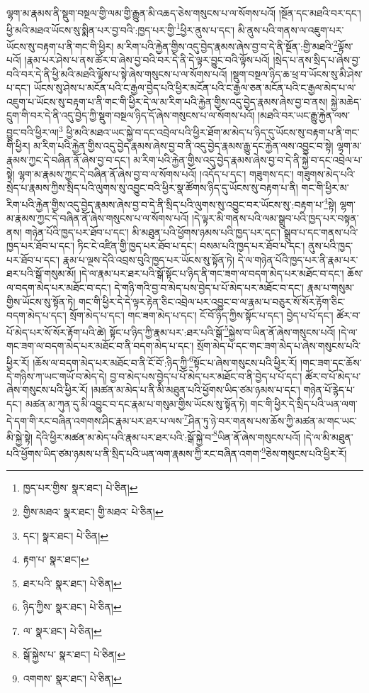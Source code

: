 ལྷག་མ་རྣམས་ནི་སྡུག་བསྔལ་གྱི་ལམ་གྱི་རྒྱུན་མི་འཆད་ཅེས་གསུངས་པ་ལ་སོགས་པའོ། །སྔོན་དང་མཐའི་བར་དང་། ཕྱི་མའི་མཐའ་ཡོངས་སུ་སྨིན་པར་བྱ་བའི་:ཁྱད་པར་གྱི་\footnote{ཁྱད་པར་གྱིས་  སྣར་ཐང་།  པེ་ཅིན། }ཕྱིར་ནུས་པ་དང་། མི་ནུས་པའི་གནས་ལ་འཇུག་པར་ཡོངས་སུ་བརྟག་པ་ནི་གང་གི་ཕྱིར། མ་རིག་པའི་རྐྱེན་གྱིས་འདུ་བྱེད་རྣམས་ཞེས་བྱ་བ་དེ་ནི་སྔོན་:གྱི་མཐའི་\footnote{གྱིས་མཐའ་  སྣར་ཐང་། གྱི་མཐའ་  པེ་ཅིན། }ལྟོས་པའོ། །རྣམ་པར་ཤེས་པ་ནས་ཚོར་བ་ཞེས་བྱ་བའི་བར་དེ་ནི་དེ་ལྟར་བྱུང་བའི་ལྟོས་པའོ། །སྲེད་པ་ནས་སྲིད་པ་ཞེས་བྱ་བའི་བར་དེ་ནི་ཕྱི་མའི་མཐའི་ལྟོས་པ་སྟེ་ཞེས་གསུངས་པ་ལ་སོགས་པའོ། །སྡུག་བསྔལ་ཉིད་ཆ་ཕྲ་བ་ཡོངས་སུ་མི་ཤེས་པ་དང་། ཡོངས་སུ་ཤེས་པ་མངོན་པའི་ང་རྒྱལ་བྱེད་པའི་ཕྱིར་མངོན་པའི་ང་རྒྱལ་ཅན་མངོན་པའི་ང་རྒྱལ་མེད་པ་ལ་འཇུག་པ་ཡོངས་སུ་བརྟག་པ་ནི་གང་གི་ཕྱིར་དེ་ལ་མ་རིག་པའི་རྐྱེན་གྱིས་འདུ་བྱེད་རྣམས་ཞེས་བྱ་བ་ནས། སྐྱེ་མཆེད་དྲུག་གི་བར་དེ་ནི་འདུ་བྱེད་ཀྱི་སྡུག་བསྔལ་ཉིད་དོ་ཞེས་གསུངས་པ་ལ་སོགས་པའོ། །མཐའི་བར་ཡང་རྒྱུ་རྐྱེན་ལས་བྱུང་བའི་ཕྱིར་ལ།\footnote{དང་།  སྣར་ཐང་།  པེ་ཅིན། } ཕྱི་མའི་མཐའ་ཡང་སྐྱེ་བ་དང་འབྲེལ་པའི་ཕྱིར་ཐོག་མ་མེད་པ་ཉིད་དུ་ཡོངས་སུ་བརྟག་པ་ནི་གང་གི་ཕྱིར། མ་རིག་པའི་རྐྱེན་གྱིས་འདུ་བྱེད་རྣམས་ཞེས་བྱ་བ་ནི་འདུ་བྱེད་རྣམས་རྒྱུ་དང་རྐྱེན་ལས་འབྱུང་བ་སྟེ། ལྷག་མ་རྣམས་ཀྱང་དེ་བཞིན་ནོ་ཞེས་བྱ་བ་དང་། མ་རིག་པའི་རྐྱེན་གྱིས་འདུ་བྱེད་རྣམས་ཞེས་བྱ་བ་དེ་ནི་སྐྱེ་བ་དང་འབྲེལ་པ་སྟེ། ལྷག་མ་རྣམས་ཀྱང་དེ་བཞིན་ནོ་ཞེས་བྱ་བ་ལ་སོགས་པའོ། །འདོད་པ་དང་། གཟུགས་དང་། གཟུགས་མེད་པའི་སྲེད་པ་རྣམས་ཀྱིས་སྲིད་པའི་ལུགས་སུ་འབྱུང་བའི་ཕྱིར་སྣ་ཚོགས་ཉིད་དུ་ཡོངས་སུ་བརྟག་པ་ནི། གང་གི་ཕྱིར་མ་རིག་པའི་རྐྱེན་གྱིས་འདུ་བྱེད་རྣམས་ཞེས་བྱ་བ་དེ་ནི་སྲིད་པའི་ལུགས་སུ་འབྱུང་བར་ཡོངས་སུ་:བརྟག་པ་\footnote{རྟག་པ་  སྣར་ཐང་། }སྟེ། ལྷག་མ་རྣམས་ཀྱང་དེ་བཞིན་ནོ་ཞེས་གསུངས་པ་ལ་སོགས་པའོ། །དེ་ལྟར་མི་གནས་པའི་ལམ་སྒྲུབ་པའི་ཁྱད་པར་བསྟན་ནས། གཉེན་པོའི་ཁྱད་པར་ཐོབ་པ་དང་། མི་མཐུན་པའི་ཕྱོགས་ཉམས་པའི་ཁྱད་པར་དང་། སྒྲུབ་པ་དང་གནས་པའི་ཁྱད་པར་ཐོབ་པ་དང་། ཏིང་ངེ་འཛིན་གྱི་ཁྱད་པར་ཐོབ་པ་དང་། བསམ་པའི་ཁྱད་པར་ཐོབ་པ་དང་། ནུས་པའི་ཁྱད་པར་ཐོབ་པ་དང་། རྣམ་པ་ལྔས་དེའི་འབྲས་བུའི་ཁྱད་པར་ཡོངས་སུ་སྟོན་ཏེ། དེ་ལ་གཉེན་པོའི་ཁྱད་པར་ནི་རྣམ་པར་ཐར་པའི་སྒོ་གསུམ་མོ། །དེ་ལ་རྣམ་པར་ཐར་པའི་སྒོ་སྟོང་པ་ཉིད་ནི་གང་ཟག་ལ་བདག་མེད་པར་མཐོང་བ་དང་། ཆོས་ལ་བདག་མེད་པར་མཐོང་བ་དང་། དེ་གཉི་གའི་བྱ་བ་མེད་པས་བྱེད་པ་པོ་མེད་པར་མཐོང་བ་དང་། རྣམ་པ་གསུམ་གྱིས་ཡོངས་སུ་སྟོན་ཏེ། གང་གི་ཕྱིར་དེ་དེ་ལྟར་རྟེན་ཅིང་འབྲེལ་པར་འབྱུང་བ་ལ་རྣམ་པ་བཅུར་སོ་སོར་རྟོག་ཅིང་བདག་མེད་པ་དང་། སྲོག་མེད་པ་དང་། གང་ཟག་མེད་པ་དང་། ངོ་བོ་ཉིད་ཀྱིས་སྟོང་པ་དང་། བྱེད་པ་པོ་དང་། ཚོར་བ་པོ་མེད་པར་སོ་སོར་རྟོག་པའི་ཚེ། སྟོང་པ་ཉིད་ཀྱི་རྣམ་པར་:ཐར་པའི་སྒོ་\footnote{ཐར་པའི་  སྣར་ཐང་།  པེ་ཅིན། }སྐྱེས་བ་ཡིན་ནོ་ཞེས་གསུངས་པའོ། །དེ་ལ་གང་ཟག་ལ་བདག་མེད་པར་མཐོང་བ་ནི་བདག་མེད་པ་དང་། སྲོག་མེད་པ་དང་གང་ཟག་མེད་པ་ཞེས་གསུངས་པའི་ཕྱིར་རོ། །ཆོས་ལ་བདག་མེད་པར་མཐོང་བ་ནི་ངོ་བོ་:ཉིད་ཀྱི་\footnote{ཉིད་ཀྱིས་  སྣར་ཐང་།  པེ་ཅིན། }སྟོང་པ་ཞེས་གསུངས་པའི་ཕྱིར་རོ། །གང་ཟག་དང་ཆོས་དེ་གཉིས་ཀ་ཡང་གཡོ་བ་མེད་དེ། བྱ་བ་མེད་པས་བྱེད་པ་པོ་མེད་པར་མཐོང་བ་ནི་བྱེད་པ་པོ་དང་། ཚོར་བ་པོ་མེད་པ་ཞེས་གསུངས་པའི་ཕྱིར་རོ། །མཚན་མ་མེད་པ་ནི་མི་མཐུན་པའི་ཕྱོགས་ཡིད་ཙམ་ཉམས་པ་དང་། གཉེན་པོ་རྙེད་པ་དང་། མཚན་མ་ཀུན་དུ་མི་འབྱུང་བ་དང་རྣམ་པ་གསུམ་གྱིས་ཡོངས་སུ་སྟོན་ཏེ། གང་གི་ཕྱིར་དེ་སྲིད་པའི་ཡན་ལག་དེ་དག་གི་རང་བཞིན་འགགས་ཤིང་རྣམ་པར་ཐར་པ་ལས་\footnote{ལ་  སྣར་ཐང་།  པེ་ཅིན། }ཤིན་ཏུ་ཉེ་བར་གནས་པས་ཆོས་ཀྱི་མཚན་མ་གང་ཡང་མི་སྐྱེ་སྟེ། དེའི་ཕྱིར་མཚན་མ་མེད་པའི་རྣམ་པར་ཐར་པའི་:སྒོ་སྐྱེ་བ་\footnote{སྒོ་སྐྱེས་པ་  སྣར་ཐང་།  པེ་ཅིན། }ཡིན་ནོ་ཞེས་གསུངས་པའོ། །དེ་ལ་མི་མཐུན་པའི་ཕྱོགས་ཡིད་ཙམ་ཉམས་པ་ནི་སྲིད་པའི་ཡན་ལག་རྣམས་ཀྱི་རང་བཞིན་འགག་\footnote{འགགས་  སྣར་ཐང་།  པེ་ཅིན། }ཅེས་གསུངས་པའི་ཕྱིར་རོ། 